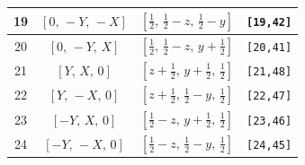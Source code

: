 \documentclass[fleqn,8pt]{jsarticle}
\begin{document}
\begin{longtable}{cccc}
19 & $\left[ 0,\, - Y,\, - X \right]$ & $\left[ \frac{1}{2},\, \frac{1}{2} - z,\, \frac{1}{2} - y \right]$ & {\tt [19,42]} \\ \hline
20 & $\left[ 0,\, - Y,\, X \right]$ & $\left[ \frac{1}{2},\, \frac{1}{2} - z,\, y + \frac{1}{2} \right]$ & {\tt [20,41]} \\ \hline
21 & $\left[ Y,\, X,\, 0 \right]$ & $\left[ z + \frac{1}{2},\, y + \frac{1}{2},\, \frac{1}{2} \right]$ & {\tt [21,48]} \\ \hline
22 & $\left[ Y,\, - X,\, 0 \right]$ & $\left[ z + \frac{1}{2},\, \frac{1}{2} - y,\, \frac{1}{2} \right]$ & {\tt [22,47]} \\ \hline
23 & $\left[ - Y,\, X,\, 0 \right]$ & $\left[ \frac{1}{2} - z,\, y + \frac{1}{2},\, \frac{1}{2} \right]$ & {\tt [23,46]} \\ \hline
24 & $\left[ - Y,\, - X,\, 0 \right]$ & $\left[ \frac{1}{2} - z,\, \frac{1}{2} - y,\, \frac{1}{2} \right]$ & {\tt [24,45]} \\
\end{longtable}
\renewcommand{\arraystretch}{1.2}
\end{document}
